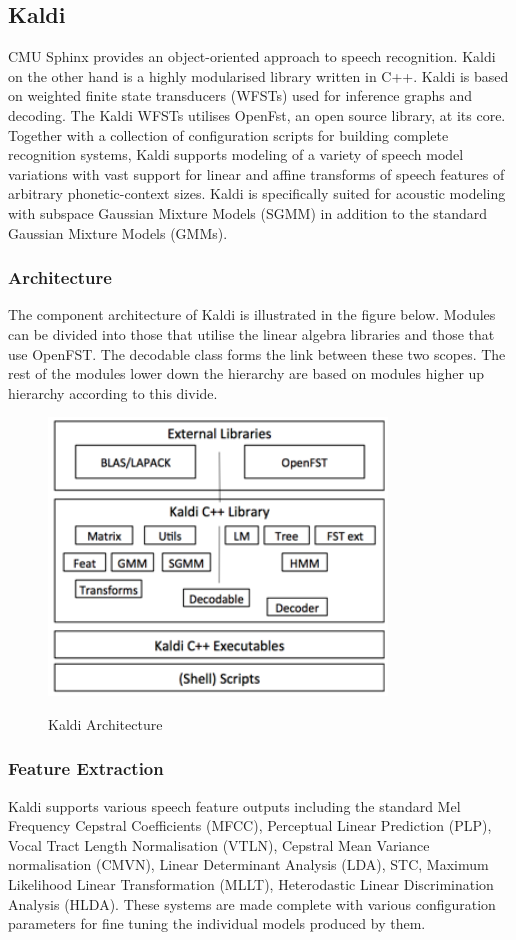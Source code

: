 \subsection{Kaldi}
CMU Sphinx provides an object-oriented approach to speech recognition. Kaldi \cite{povey2011subspace} on the other hand is a highly modularised library written in C++. Kaldi is based on weighted finite state transducers (WFSTs) used for inference graphs and decoding. The Kaldi WFSTs utilises OpenFst, an open source library, at its core. Together with a collection of configuration scripts for building complete recognition systems, Kaldi supports modeling of a variety of speech model variations with vast support for linear and affine transforms of speech features of arbitrary phonetic-context sizes.  Kaldi is specifically suited for acoustic modeling with subspace Gaussian Mixture Models (SGMM) in addition to the standard Gaussian Mixture Models (GMMs).
\subsubsection{Architecture}
The component architecture of Kaldi is illustrated in the figure below.  Modules can be divided into those that utilise the linear algebra libraries and those that use OpenFST.  The decodable class forms the link between these two scopes.  The rest of the modules lower down the hierarchy are based on modules higher up hierarchy according to this divide.
\begin{figure}
\centering
  \includegraphics[width=9cm]{thesis/images/kaldi}\\
  \caption{Kaldi Architecture\citep{povey2011kaldi}}\label{fig_c3_kaldi}
\end{figure}
\subsubsection{Feature Extraction}
Kaldi supports various speech feature outputs including the standard Mel Frequency Cepstral Coefficients (MFCC), Perceptual Linear Prediction (PLP), Vocal Tract Length Normalisation (VTLN), Cepstral Mean Variance normalisation (CMVN), Linear Determinant Analysis (LDA), STC, Maximum Likelihood Linear Transformation (MLLT), Heterodastic Linear Discrimination Analysis (HLDA).  These systems are made complete with various configuration parameters for fine tuning the individual models produced by them.
